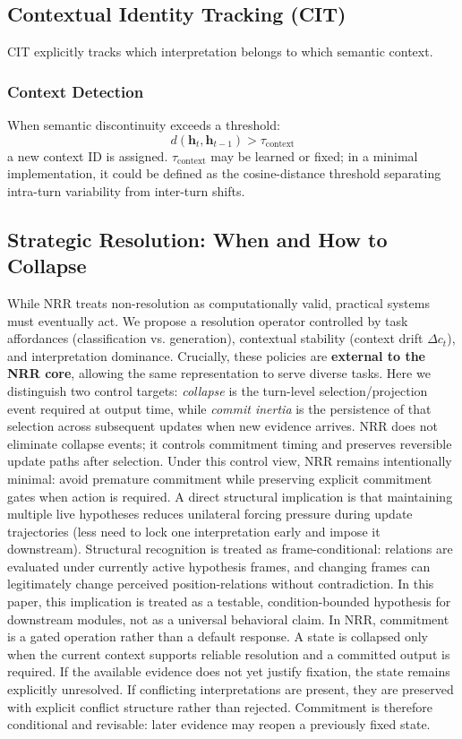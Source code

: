 \documentclass[11pt,a4paper]{article}
\begin{document}
\subsection{Contextual Identity Tracking (CIT)}

CIT explicitly tracks which interpretation belongs to which semantic context.

\subsubsection{Context Detection}
When semantic discontinuity exceeds a threshold:
\begin{equation}
d(\mathbf{h}_t, \mathbf{h}_{t-1}) > \tau_{\text{context}}
\end{equation}
a new context ID is assigned.
$\tau_{\text{context}}$ may be learned or fixed; in a minimal implementation, it could be defined as the cosine-distance threshold separating intra-turn variability from inter-turn shifts.

\subsection{Strategic Resolution: When and How to Collapse}

While NRR treats non-resolution as computationally valid, practical systems must eventually act.
We propose a resolution operator controlled by task affordances (classification vs. generation), contextual stability (context drift $\Delta c_t$), and interpretation dominance.
Crucially, these policies are \textbf{external to the NRR core}, allowing the same representation to serve diverse tasks.
Here we distinguish two control targets: \emph{collapse} is the turn-level selection/projection event required at output time, while \emph{commit inertia} is the persistence of that selection across subsequent updates when new evidence arrives. NRR does not eliminate collapse events; it controls commitment timing and preserves reversible update paths after selection.
Under this control view, NRR remains intentionally minimal: avoid premature commitment while preserving explicit commitment gates when action is required. A direct structural implication is that maintaining multiple live hypotheses reduces unilateral forcing pressure during update trajectories (less need to lock one interpretation early and impose it downstream). Structural recognition is treated as frame-conditional: relations are evaluated under currently active hypothesis frames, and changing frames can legitimately change perceived position-relations without contradiction. In this paper, this implication is treated as a testable, condition-bounded hypothesis for downstream modules, not as a universal behavioral claim.
In NRR, commitment is a gated operation rather than a default response.
A state is collapsed only when the current context supports reliable resolution and a committed output is required.
If the available evidence does not yet justify fixation, the state remains explicitly unresolved.
If conflicting interpretations are present, they are preserved with explicit conflict structure rather than rejected.
Commitment is therefore conditional and revisable: later evidence may reopen a previously fixed state.
\end{document}
